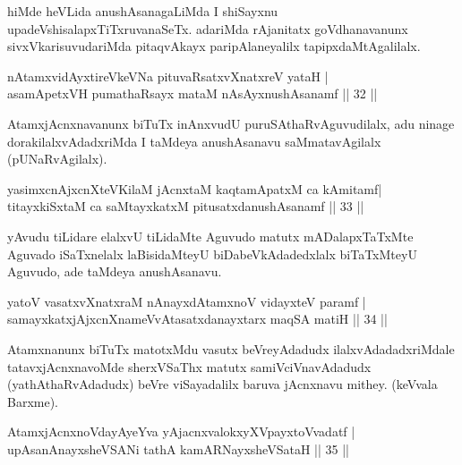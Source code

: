 \begin{artha}
hiMde heVLida anushAsanagaLiMda I shiSayxnu upadeVshisalapxTiTxruvanaSeTx. adariMda rAjanitatx goVdhanavanunx sivxVkarisuvudariMda pitaqvAkayx paripAlaneyalilx tapipxdaMtAgalilalx.
\end{artha}

\begin{shl}
nA\s \s tamxvidAyxtireVkeVNa pituvaRsatxvXnatxreV yataH |\\
asamApetxVH pumathaRsayx mataM nAsAyxnushAsanamf \hfill || 32 || 
\end{shl}

\begin{artha}
AtamxjAcnxnavanunx biTuTx inAnxvudU puruSAthaRvAguvudilalx, adu ninage dorakilalxvAdadxriMda I taMdeya anushAsanavu saMmatavAgilalx (pUNaRvAgilalx).
\end{artha}


\begin{shl}
yasimxcnAjxcnXteV\s KilaM jAcnxtaM kaqtamApatxM ca kAmitamf|\\
titayxkiSxtaM ca saMtayxkatxM pitusatxdanushAsanamf \hfill || 33 || 
\end{shl}

\begin{artha}
yAvudu tiLidare elalxvU tiLidaMte Aguvudo matutx mADalapxTaTxMte Aguvado iSaTxnelalx laBisidaMteyU biDabeVkAdadedxlalx biTaTxMteyU Aguvudo, ade taMdeya anushAsanavu.
\end{artha}


\begin{shl}
yatoV vasatxvXnatxraM nAnayxdAtamxnoV vidayxteV paramf |\\
samayxkatxjAjxcnXnameVvAtasatxdanayxtarx maqSA matiH \hfill || 34 || 
\end{shl}

\begin{artha}
Atamxnanunx biTuTx matotxMdu vasutx beVreyAdadudx ilalxvAdadadxriMdale tatavxjAcnxnavoMde sherxVSaThx matutx samiVciVnavAdadudx (yathAthaRvAdadudx) beVre viSayadalilx baruva jAcnxnavu mithey. (keVvala Barxme).
\end{artha}


\begin{shl}
AtamxjAcnxnoVdayAyeYva yAjacnxvalokxyXV\s payxtoV\s vadatf |\\
upAsanAnayxsheVSANi tathA kamARNayxsheVSataH \hfill || 35 || 
\end{shl}


